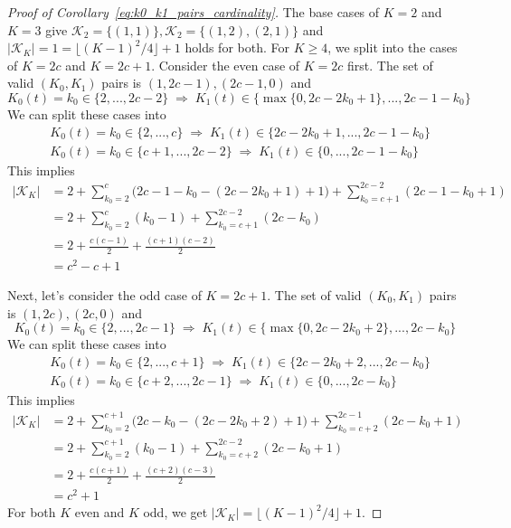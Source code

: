 \documentclass{article}
\begin{document}
\begin{proof}[Proof of Corollary~\ref{eq:k0_k1_pairs_cardinality}]
The base cases of $K=2$ and $K=3$ give $\mathcal{K}_2 = \{(1,1)\}, \mathcal{K}_2 = \{(1,2), (2,1)\}$ and $|\mathcal{K}_K| = 1=\lfloor (K-1)^2/4\rfloor + 1 $ holds for both. For $K\geq 4$, we split into the cases of $K=2c$ and $K=2c+1$. Consider the even case of $K=2c$ first. The set of valid $(K_0, K_1)$ pairs is $(1,2c-1), (2c-1, 0)$ and  \[ K_0(t) = k_0  \in \{2,...,2c-2\} \; \Rightarrow \; K_1(t) \in \Big \{ \max\{0, 2c-2k_0+1\}, ..., 2c-1-k_0 \Big \} \] 
We can split these cases into 
\begin{align*}
    & K_0(t) = k_0 \in \{ 2,..., c\} \; \Rightarrow \; K_1(t) \in \Big \{ 2c-2k_0+1, ..., 2c-1-k_0 \Big \} \\
    & K_0(t) = k_0 \in \{c +1,..., 2c-2 \} \; \Rightarrow \; K_1(t) \in \Big \{ 0, ..., 2c-1-k_0 \Big \} 
\end{align*}
This implies 
\begin{align*}
    |\mathcal{K}_K| &= 2 + \sum_{k_0=2}^c \Big( 2c-1-k_0 - (2c-2k_0+1) +1 \Big ) + \sum_{k_0=c+1}^{2c-2} (2c-1-k_0+1) \\
    &= 2 + \sum_{k_0=2}^c (k_0-1) + \sum_{k_0=c+1}^{2c-2} (2c-k_0) \\
    &= 2 + \frac{c(c-1)}{2} + \frac{(c+1)(c-2)}{2} \\
    &= c^2-c+1 
\end{align*} 

\noindent Next, let's consider the odd case of $K=2c+1$. The set of valid $(K_0, K_1)$ pairs is $(1,2c), (2c, 0)$ and  \[ K_0(t) = k_0  \in \{2,...,2c-1\} \; \Rightarrow \; K_1(t) \in \Big \{ \max\{0, 2c-2k_0+2\}, ..., 2c-k_0 \Big \}  \] 
We can split these cases into 
\begin{align*}
    & K_0(t) = k_0 \in \{ 2,..., c+1\} \; \Rightarrow \; K_1(t) \in \Big \{ 2c-2k_0+2, ..., 2c-k_0 \Big \} \\
    & K_0(t) = k_0 \in \{c +2,..., 2c-1 \} \; \Rightarrow \; K_1(t) \in \Big \{ 0, ..., 2c-k_0 \Big \} 
\end{align*}
This implies 
\begin{align*}
    |\mathcal{K}_K| &= 2 + \sum_{k_0=2}^{c+1} \Big( 2c-k_0 - (2c-2k_0+2) +1 \Big ) + \sum_{k_0=c+2}^{2c-1} (2c-k_0+1) \\
    &= 2 + \sum_{k_0=2}^{c+1} (k_0-1) + \sum_{k_0=c+2}^{2c-2} (2c-k_0+1) \\
    &= 2 + \frac{c(c+1)}{2} + \frac{(c+2)(c-3)}{2} \\
    &= c^2+1 
\end{align*} 
For both $K$ even and $K$ odd, we get $|\mathcal{K}_K| = \lfloor (K-1)^2/4\rfloor + 1$. 
\end{proof}
\end{document}
